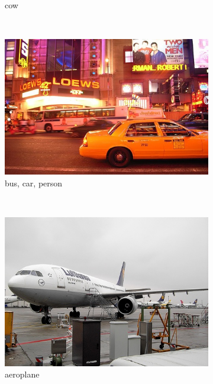 \begin{figure}[bt]
\begin{subfigure}[b]{0.18\textwidth}
        \caption{\scriptsize cow}
        \label{fig:voc7}
    \end{subfigure}
    ~
    \begin{subfigure}[b]{0.18\textwidth}
        \centering
        \includegraphics[width=\textwidth]{000014}
        \caption{\scriptsize bus, car, person}
        \label{fig:voc8}
    \end{subfigure}
    ~
    \begin{subfigure}[b]{0.18\textwidth}
        \centering
        \includegraphics[width=\textwidth]{000033}
        \caption{\scriptsize aeroplane}
        \label{fig:voc9}
    \end{subfigure}
    ~
    \begin{subfigure}[b]{0.18\textwidth}
        \centering

\end{subfigure}
\end{figure}
